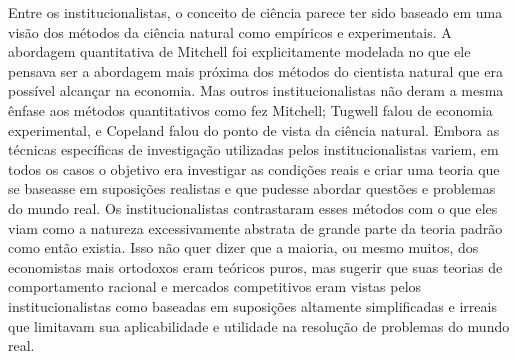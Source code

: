 \documentclass[a4paper,12pt]{article}[abntex2]
\begin{document}
Entre os institucionalistas, o conceito de ciência parece ter sido baseado em uma visão dos métodos da ciência natural como empíricos e experimentais. A abordagem quantitativa de Mitchell foi explicitamente modelada no que ele pensava ser a abordagem mais próxima dos métodos do cientista natural que era possível alcançar na economia. Mas outros institucionalistas não deram a mesma ênfase aos métodos quantitativos como fez Mitchell; Tugwell falou de economia experimental, e Copeland falou do ponto de vista da ciência natural. Embora as técnicas específicas de investigação utilizadas pelos institucionalistas variem, em todos os casos o objetivo era investigar as condições reais e criar uma teoria que se baseasse em suposições realistas e que pudesse abordar questões e problemas do mundo real. Os institucionalistas contrastaram esses métodos com o que eles viam como a natureza excessivamente abstrata de grande parte da teoria padrão como então existia. Isso não quer dizer que a maioria, ou mesmo muitos, dos economistas mais ortodoxos eram teóricos puros, mas sugerir que suas teorias de comportamento racional e mercados competitivos eram vistas pelos institucionalistas como baseadas em suposições altamente simplificadas e irreais que limitavam sua aplicabilidade e utilidade na resolução de problemas do mundo real.
\end{document}
